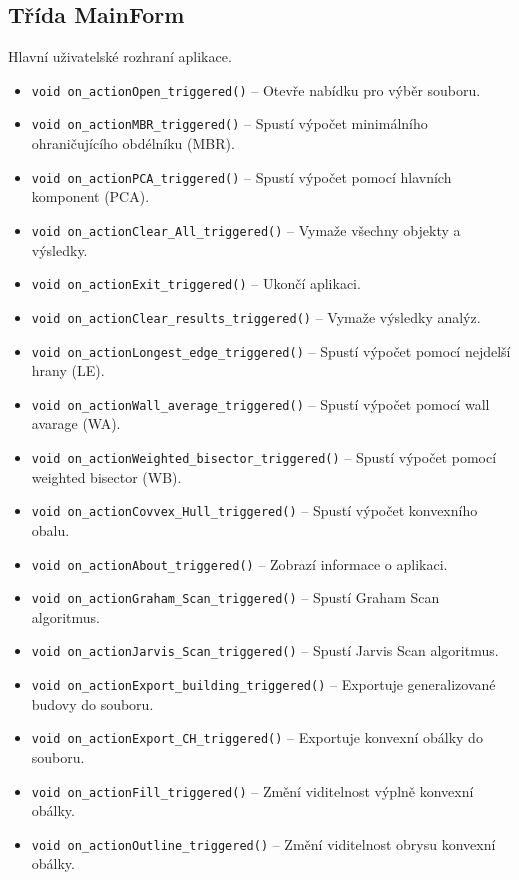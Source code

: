 \subsection{Třída MainForm}
Hlavní uživatelské rozhraní aplikace.

\begin{itemize}
\item \texttt{void on\_actionOpen\_triggered()} – Otevře nabídku pro výběr souboru.
\item \texttt{void on\_actionMBR\_triggered()} – Spustí výpočet minimálního ohraničujícího obdélníku (MBR).
\item \texttt{void on\_actionPCA\_triggered()} – Spustí výpočet pomocí hlavních komponent (PCA).
\item \texttt{void on\_actionClear\_All\_triggered()} – Vymaže všechny objekty a výsledky.
\item \texttt{void on\_actionExit\_triggered()} – Ukončí aplikaci.
\item \texttt{void on\_actionClear\_results\_triggered()} – Vymaže výsledky analýz.
\item \texttt{void on\_actionLongest\_edge\_triggered()} – Spustí výpočet pomocí nejdelší hrany (LE).
\item \texttt{void on\_actionWall\_average\_triggered()} – Spustí výpočet pomocí wall avarage (WA).
\item \texttt{void on\_actionWeighted\_bisector\_triggered()} – Spustí výpočet pomocí weighted bisector (WB).
\item \texttt{void on\_actionCovvex\_Hull\_triggered()} – Spustí výpočet konvexního obalu.
\item \texttt{void on\_actionAbout\_triggered()} – Zobrazí informace o aplikaci.
\item \texttt{void on\_actionGraham\_Scan\_triggered()} – Spustí Graham Scan algoritmus.
\item \texttt{void on\_actionJarvis\_Scan\_triggered()} – Spustí Jarvis Scan algoritmus.
\item \texttt{void on\_actionExport\_building\_triggered()} – Exportuje generalizované budovy do souboru.
\item \texttt{void on\_actionExport\_CH\_triggered()} – Exportuje konvexní obálky do souboru.
\item \texttt{void on\_actionFill\_triggered()} – Změní viditelnost výplně konvexní obálky.
\item \texttt{void on\_actionOutline\_triggered()} – Změní viditelnost obrysu konvexní obálky.
\end{itemize}

